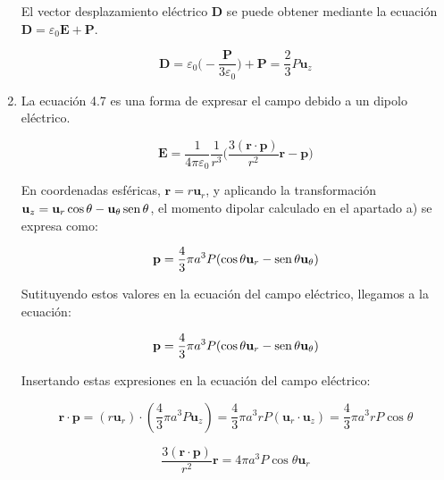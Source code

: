 \begin{enumerate}
    El vector desplazamiento eléctrico \textbf{D} se puede obtener mediante la ecuación $\mathbf{D} = \varepsilon_0 \mathbf{E} + \mathbf{P}$.


    \begin{equation*}
        \mathbf{D} = \varepsilon_0 \biggl( - \frac{\mathbf{P}}{3\varepsilon_0} \biggr) + \mathbf{P} = \frac{2}{3} P \mathbf{u}_z
    \end{equation*}

    \vspace{20px}
    \item
    La ecuación 4.7 es una forma de expresar el campo debido a un dipolo eléctrico.

    \begin{equation*}
        \mathbf{E} = \frac{1}{4\pi\varepsilon_0} \frac{1} {r^3} \biggl(
        \frac{3 (\mathbf{r} \cdot \mathbf{p})}{r^2} \mathbf{r} - \mathbf{p}
        \biggr)
    \end{equation*}

    En coordenadas esféricas, $\mathbf{r} = r \mathbf{u}_r$, y aplicando la transformación
    $\mathbf{u}_z = \mathbf{u}_r \cos \theta - \mathbf{u}_\theta \operatorname{sen}\theta$, el
    momento dipolar calculado en el apartado a) se expresa como:

    \begin{equation*}
        \mathbf{p} = \frac{4}{3} \pi a^3 P (\cos\theta \mathbf{u}_r - \operatorname{sen}\theta \mathbf{u}_\theta )
    \end{equation*}

    Sutituyendo estos valores en la ecuación del campo eléctrico, llegamos a la ecuación:


    \begin{equation*}
        \mathbf{p} = \frac{4}{3} \pi a^3 P (\cos\theta \mathbf{u}_r - \operatorname{sen}\theta \mathbf{u}_\theta )
    \end{equation*}

    Insertando estas expresiones en la ecuación del campo eléctrico:

    \begin{equation*}
        \mathbf{r} \cdot \mathbf{p} = (r \mathbf{u}_r) \cdot
        (\frac{4}{3} \pi a^3 P \mathbf{u}_z)
        = \frac{4}{3} \pi a^3 r P ( \mathbf{u}_r \cdot \mathbf{u}_z ) =
        \frac{4}{3} \pi a^3 r P \cos\theta
    \end{equation*}

    \begin{equation*}
        \frac{3(   \mathbf{r} \cdot \mathbf{p} )} {r^2} \mathbf{r} =
        4 \pi a^3 P \cos\theta  \mathbf{u}_r
    \end{equation*}


\end{enumerate}
